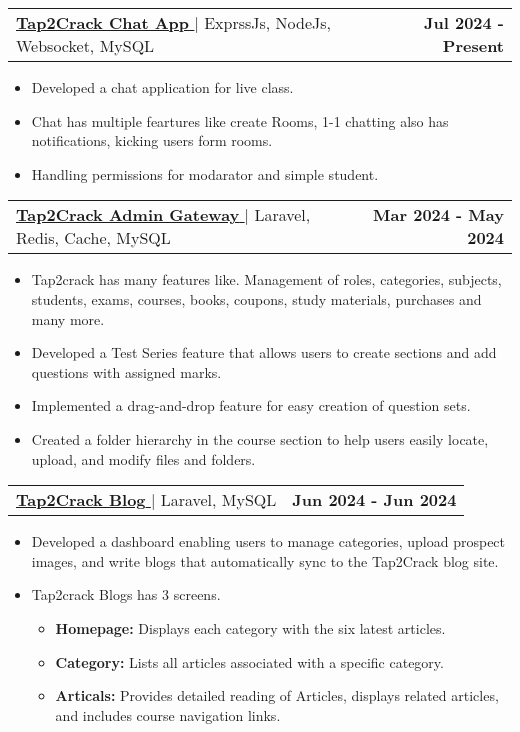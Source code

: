 \documentclass[letterpaper,11pt]{article}
\makeatletter
\newcommand{\resumeItem}[1]{
  \item\small{
    {#1 \vspace{-2pt}}
  }
}
\newcommand{\resumeProjectHeading}[2]{
    \item
    \begin{tabular*}{1.001\textwidth}{l@{\extracolsep{\fill}}r}
      \small#1 & \textbf{\small #2}\\
    \end{tabular*}\vspace{-7pt}
}
\newcommand{\resumeItemListStart}{\begin{itemize}}
\newcommand{\resumeItemListEnd}{\end{itemize}\vspace{-5pt}}
\makeatother
\begin{document}
        \resumeProjectHeading
          {\href{}{\textbf{\large{\underline{Tap2Crack Chat App}}} \href{}{\raisebox{-0.1\height}\faExternalLink }} $|$ \large{ExprssJs, NodeJs, Websocket, MySQL}}{Jul 2024 - Present}
          \resumeItemListStart
            \resumeItem{\normalsize{Developed a chat application for live class.}}
            \resumeItem{\normalsize{Chat has multiple feartures like create Rooms, 1-1 chatting also has notifications, kicking users form rooms.}}
            \resumeItem{\normalsize{Handling permissions for modarator and simple student.}}
          \resumeItemListEnd
          \vspace{-13pt}

        \resumeProjectHeading
          {\href{}{\textbf{\large{\underline{Tap2Crack Admin Gateway}}} \href{}{\raisebox{-0.1\height}\faExternalLink }} $|$ \large{Laravel, Redis, Cache, MySQL}}{Mar 2024 - May 2024}
          \resumeItemListStart
            \resumeItem{\normalsize{Tap2crack has many features like. Management of roles, categories, subjects, students, exams, courses, books, coupons, study materials, purchases and many more. }}
            \resumeItem{\normalsize{Developed a Test Series feature that allows users to create sections and add questions with assigned marks.}}
            \resumeItem{\normalsize{Implemented a drag-and-drop feature for easy creation of question sets.}}
            \resumeItem{\normalsize{Created a folder hierarchy in the course section to help users easily locate, upload, and modify files and folders.}}
          \resumeItemListEnd
          \vspace{-13pt}
        
      \resumeProjectHeading
          {\href{}{\textbf{\large{\underline{Tap2Crack Blog}}} \href{}{\raisebox{-0.1\height}\faExternalLink }} $|$ \large{Laravel, MySQL}}{Jun 2024 - Jun 2024}
          \resumeItemListStart
            \resumeItem{\normalsize{Developed a dashboard enabling users to manage categories, upload prospect images, and write blogs that automatically sync to the Tap2Crack blog site.}}
            \resumeItem{\normalsize{Tap2crack Blogs has 3 screens.}}
            \resumeItemListStart
                \resumeItem{\normalsize{\textbf{Homepage:} Displays each category with the six latest articles.}}
                \resumeItem{\normalsize{\textbf{Category:} Lists all articles associated with a specific category.}}
                \resumeItem{\normalsize{\textbf{Articals:} Provides detailed reading of Articles, displays related articles, and includes course navigation links.}}
            \resumeItemListEnd
          \resumeItemListEnd
          \vspace{-13pt}
          
\end{document}

